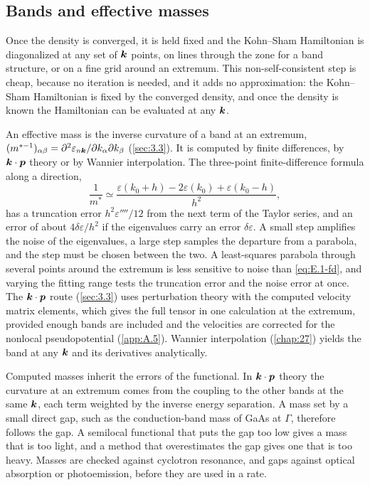 \subsection{Bands and effective masses}

Once the density is converged, it is held fixed and the Kohn--Sham Hamiltonian is diagonalized at any set of $\bm{k}$ points, on lines through the zone for a band structure, or on a fine grid around an extremum. This non-self-consistent step is cheap, because no iteration is needed, and it adds no approximation: the Kohn--Sham Hamiltonian is fixed by the converged density, and once the density is known the Hamiltonian can be evaluated at any $\bm{k}$.

An effective mass is the inverse curvature of a band at an extremum, $(m^{*-1})_{\alpha\beta} = \partial^2\varepsilon_{n\bm{k}}/\partial k_\alpha\partial k_\beta$ (\cref{sec:3.3}). It is computed by finite differences, by $\bm{k}\cdot\bm{p}$ theory or by Wannier interpolation. The three-point finite-difference formula along a direction,
\begin{equation}
  \frac{1}{m^*} \simeq \frac{\varepsilon(k_0 + h) - 2\varepsilon(k_0) + \varepsilon(k_0 - h)}{h^2} ,
  \label{eq:E.1-fd}
\end{equation}
has a truncation error $h^2\varepsilon''''/12$ from the next term of the Taylor series, and an error of about $4\delta\varepsilon/h^2$ if the eigenvalues carry an error $\delta\varepsilon$. A small step amplifies the noise of the eigenvalues, a large step samples the departure from a parabola, and the step must be chosen between the two. A least-squares parabola through several points around the extremum is less sensitive to noise than \cref{eq:E.1-fd}, and varying the fitting range tests the truncation error and the noise error at once. The $\bm{k}\cdot\bm{p}$ route (\cref{sec:3.3}) uses perturbation theory with the computed velocity matrix elements, which gives the full tensor in one calculation at the extremum, provided enough bands are included and the velocities are corrected for the nonlocal pseudopotential (\cref{app:A.5}). Wannier interpolation (\cref{chap:27}) yields the band at any $\bm{k}$ and its derivatives analytically.

Computed masses inherit the errors of the functional. In $\bm{k}\cdot\bm{p}$ theory the curvature at an extremum comes from the coupling to the other bands at the same $\bm{k}$, each term weighted by the inverse energy separation. A mass set by a small direct gap, such as the conduction-band mass of GaAs at $\Gamma$, therefore follows the gap. A semilocal functional that puts the gap too low gives a mass that is too light, and a method that overestimates the gap gives one that is too heavy. Masses are checked against cyclotron resonance, and gaps against optical absorption or photoemission, before they are used in a rate.

